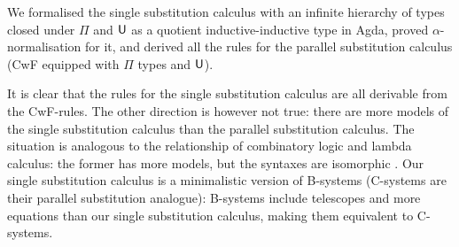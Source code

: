 \documentclass{easychair}
\begin{document}
We formalised the single substitution calculus with an infinite
hierarchy of types closed under $\Pi$ and $\mathsf{U}$ as a quotient
inductive-inductive type in Agda, proved $\alpha$-normalisation for
it, and derived all the rules for the parallel substitution calculus
(CwF equipped with $\Pi$ types and $\mathsf{U}$).

It is clear that the rules for the single substitution calculus are
all derivable from the CwF-rules. The other direction is however not
true: there are more models of the single substitution calculus than
the parallel substitution calculus. The situation is analogous to the
relationship of combinatory logic and lambda calculus: the former has
more models, but the syntaxes are isomorphic
\cite{DBLP:conf/fscd/AltenkirchKSV23}. Our single substitution
calculus is a minimalistic version of B-systems
\cite{AHRENS_EMMENEGGER_NORTH_RIJKE_2023} (C-systems are their
parallel substitution analogue): B-systems include telescopes and more
equations than our single substitution calculus, making them
equivalent to C-systems.

\label{sect:bib}

%
%
%


\end{document}
